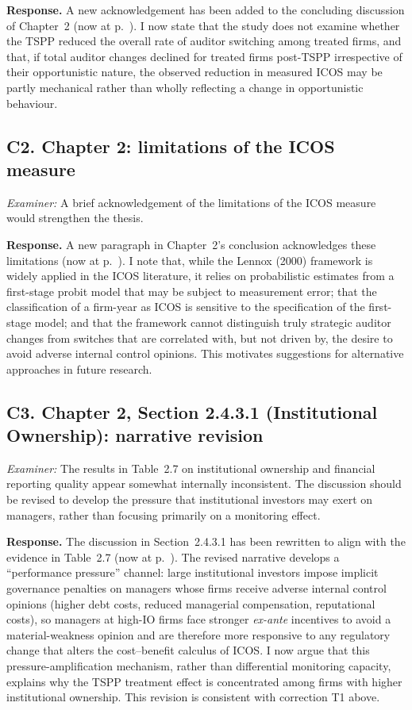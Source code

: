 \documentclass[11pt,a4paper]{article}
\newcommand{\nowat}[1]{(now at p.~\pageref{#1})}
\begin{document}
\noindent\textbf{Response.} A new acknowledgement has been added to the concluding discussion of Chapter~2 \nowat{viva:c2-switching}. I now state that the study does not examine whether the TSPP reduced the overall rate of auditor switching among treated firms, and that, if total auditor changes declined for treated firms post-TSPP irrespective of their opportunistic nature, the observed reduction in measured ICOS may be partly mechanical rather than wholly reflecting a change in opportunistic behaviour.

\subsection*{C2. Chapter 2: limitations of the ICOS measure}
\textit{Examiner:} A brief acknowledgement of the limitations of the ICOS measure would strengthen the thesis.

\noindent\textbf{Response.} A new paragraph in Chapter~2's conclusion acknowledges these limitations \nowat{viva:c2-measure}. I note that, while the Lennox (2000) framework is widely applied in the ICOS literature, it relies on probabilistic estimates from a first-stage probit model that may be subject to measurement error; that the classification of a firm-year as ICOS is sensitive to the specification of the first-stage model; and that the framework cannot distinguish truly strategic auditor changes from switches that are correlated with, but not driven by, the desire to avoid adverse internal control opinions. This motivates suggestions for alternative approaches in future research.

\subsection*{C3. Chapter 2, Section 2.4.3.1 (Institutional Ownership): narrative revision}
\textit{Examiner:} The results in Table~2.7 on institutional ownership and financial reporting quality appear somewhat internally inconsistent. The discussion should be revised to develop the pressure that institutional investors may exert on managers, rather than focusing primarily on a monitoring effect.

\noindent\textbf{Response.} The discussion in Section~2.4.3.1 has been rewritten to align with the evidence in Table~2.7 \nowat{viva:c2-pressure}. The revised narrative develops a ``performance pressure'' channel: large institutional investors impose implicit governance penalties on managers whose firms receive adverse internal control opinions (higher debt costs, reduced managerial compensation, reputational costs), so managers at high-IO firms face stronger \emph{ex-ante} incentives to avoid a material-weakness opinion and are therefore more responsive to any regulatory change that alters the cost--benefit calculus of ICOS. I now argue that this pressure-amplification mechanism, rather than differential monitoring capacity, explains why the TSPP treatment effect is concentrated among firms with higher institutional ownership. This revision is consistent with correction T1 above.
\end{document}
